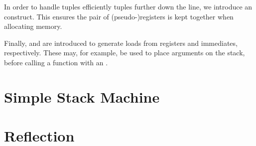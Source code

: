 In order to handle tuples efficiently tuples further down the line, we introduce an  construct.
This ensures the pair of (pseudo-)registers is kept together when allocating memory.

Finally,  and  are introduced to generate loads from registers and immediates, respectively.
These may, for example, be used to place arguments on the stack, before calling a function with an .


\section{Simple Stack Machine}


\section{Reflection}


